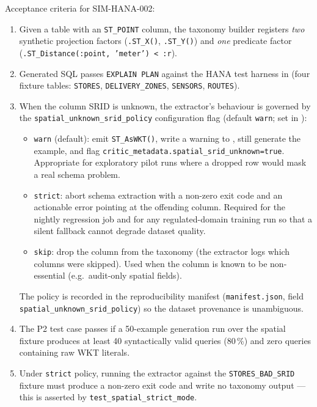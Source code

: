 \documentclass[12pt,a4paper,twoside]{report}
\begin{document}
\noindent
Acceptance criteria for SIM-HANA-002:

\begin{enumerate}
\item Given a table with an \texttt{ST\_POINT} column, the taxonomy
builder registers \emph{two} synthetic projection factors
(\texttt{.ST\_X()}, \texttt{.ST\_Y()}) and \emph{one} predicate
factor (\texttt{.ST\_Distance(:point, 'meter') < :r}).
\item Generated SQL passes \texttt{EXPLAIN PLAN} against the HANA
test harness in 
(four fixture tables: \texttt{STORES}, \texttt{DELIVERY\_ZONES},
\texttt{SENSORS}, \texttt{ROUTES}).
\item When the column SRID is unknown, the extractor's behaviour is
governed by the \texttt{spatial\_unknown\_srid\_policy}
configuration flag (default \texttt{warn}; set in
):
\begin{itemize}
\item \texttt{warn} (default): emit \texttt{ST\_AsWKT()},
write a warning to
, still
generate the example, and flag
\texttt{critic\_metadata.spatial\_srid\_unknown=true}.
Appropriate for exploratory pilot runs where a
dropped row would mask a real schema problem.
\item \texttt{strict}: abort schema extraction with a
non-zero exit code and an actionable error pointing
at the offending column. Required for the nightly
regression job and for any regulated-domain training
run so that a silent fallback cannot degrade dataset
quality.
\item \texttt{skip}: drop the column from the taxonomy
(the extractor logs which columns were skipped).
Used when the column is known to be non-essential
(e.g.\ audit-only spatial fields).
\end{itemize}
The policy is recorded in the reproducibility manifest
(\texttt{manifest.json}, field
\texttt{spatial\_unknown\_srid\_policy}) so the dataset
provenance is unambiguous.
\item The P2 test case passes if a 50-example generation run over
the spatial fixture produces at least 40 syntactically valid
queries (80\,\%) and zero queries containing raw WKT literals.
\item Under \texttt{strict} policy, running the extractor against
the \texttt{STORES\_BAD\_SRID} fixture must produce a
non-zero exit code and write no taxonomy output --- this is
asserted by \texttt{test\_spatial\_strict\_mode}.
\end{enumerate}
\end{document}
